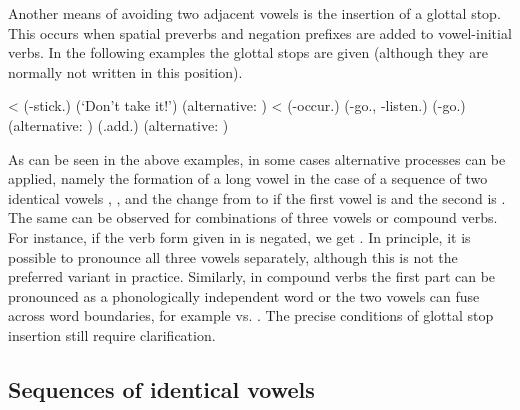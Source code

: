 Another means of avoiding two adjacent vowels is the insertion of a glottal stop. This occurs when spatial preverbs and negation prefixes are added to vowel-initial verbs. In the following examples the glottal stops are given (although they are normally not written in this position).
%
\begin{exe}
	\ex	\label{ex:glottal stop inversion phon}
	\begin{xlist}
		\TabPositions{3em}
		\ex	{}	\tab	{} <  (-stick.)
		\ex	\label{Don't take it!Phon}  	\tab	{} (`Don't take it!')	(alternative: )	
		\ex	{}	\tab	{} <  	(-occur.)
		\ex	{}	\tab	{}	(-go., -listen.)
		\ex	\label{hitherGOPHON}  	\tab	{} (-go.) (alternative: )	
		\ex	{}	\tab	{} 	
		\ex	\label{insideADDPHON} 	\tab	{} (.add.) (alternative: )	
	\end{xlist}
\end{exe}

As can be seen in the above examples, in some cases alternative processes can be applied, namely the formation of a long vowel in the case of a sequence of two identical vowels , , and the change from  to  if the first vowel is  and the second is  . The same can be observed for combinations of three vowels or compound verbs. For instance, if the verb form  given in  is negated, we get . In principle, it is possible to pronounce all three vowels separately, although this is not the preferred variant in practice. Similarly, in compound verbs the first part can be pronounced as a phonologically independent word or the two vowels can fuse across word boundaries, for example  vs.  . The precise conditions of glottal stop insertion still require clarification.



\subsection{Sequences of identical vowels}
\label{ssec:Sequences of identical vowels}

